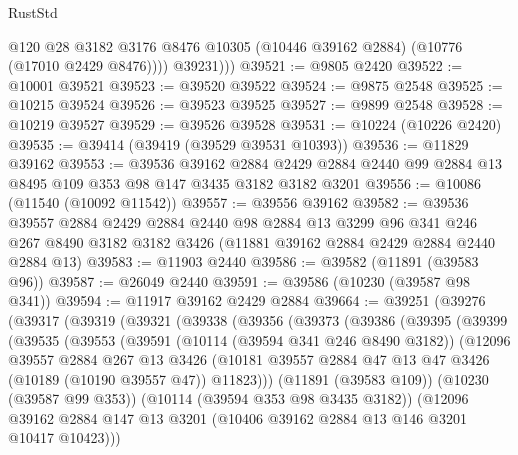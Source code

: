 \begin{lexlean}{RustStd}
\begin{coremodule}
              @120
              @28
              @3182
              @3176
              @8476
              @10305
              (@10446 @39162 @2884)
              (@10776 (@17010 @2429 @8476))))
          @39231)))
@39521 := @9805 @2420
@39522 := @10001 @39521
@39523 := @39520 @39522
@39524 := @9875 @2548
@39525 := @10215 @39524
@39526 := @39523 @39525
@39527 := @9899 @2548
@39528 := @10219 @39527
@39529 := @39526 @39528
@39531 := @10224 (@10226 @2420)
@39535 := @39414 (@39419 (@39529 @39531 @10393))
@39536 := @11829 @39162
@39553 := @39536
    @39162
    @2884
    @2429
    @2884
    @2440
    @99
    @2884
    @13
    @8495
    @109
    @353
    @98
    @147
    @3435
    @3182
    @3182
    @3201
@39556 := @10086 (@11540 (@10092 @11542))
@39557 := @39556 @39162
@39582 := @39536
    @39557
    @2884
    @2429
    @2884
    @2440
    @98
    @2884
    @13
    @3299
    @96
    @341
    @246
    @267
    @8490
    @3182
    @3182
    @3426
    (@11881 @39162 @2884 @2429 @2884 @2440 @2884 @13)
@39583 := @11903 @2440
@39586 := @39582 (@11891 (@39583 @96))
@39587 := @26049 @2440
@39591 := @39586 (@10230 (@39587 @98 @341))
@39594 := @11917 @39162 @2429 @2884
@39664 := @39251
    (@39276
      (@39317
        (@39319
          (@39321
            (@39338
              (@39356
                (@39373
                  (@39386
                    (@39395
                      (@39399
                        (@39535
                          (@39553
                            (@39591
                              (@10114 (@39594 @341 @246 @8490 @3182))
                              (@12096
                                @39557
                                @2884
                                @267
                                @13
                                @3426
                                (@10181
                                  @39557
                                  @2884
                                  @47
                                  @13
                                  @47
                                  @3426
                                  (@10189 (@10190 @39557 @47))
                                  @11823)))
                            (@11891 (@39583 @109))
                            (@10230 (@39587 @99 @353))
                            (@10114 (@39594 @353 @98 @3435 @3182))
                            (@12096
                              @39162
                              @2884
                              @147
                              @13
                              @3201
                              (@10406 @39162 @2884 @13 @146 @3201 @10417 @10423)))

\end{coremodule}
\end{lexlean}
